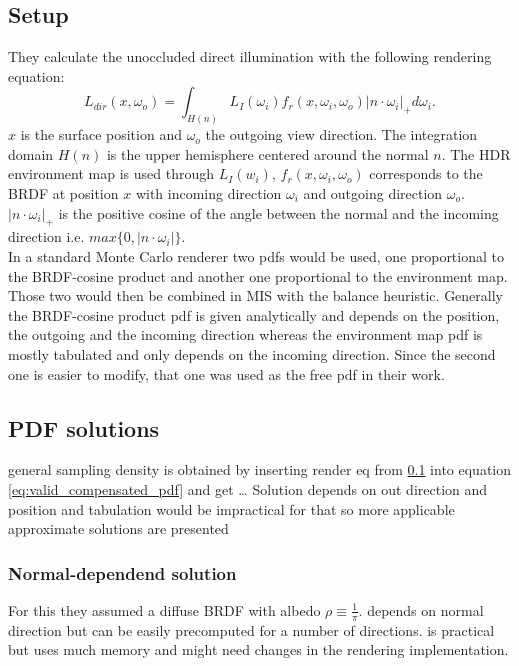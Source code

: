 \subsection{Setup}
\label{sec:ibl_setup}
They calculate the unoccluded direct illumination with the following rendering equation:
\begin{equation*}
    L_{dir}(x, \omega_o) = \int_{H(n)} L_I(\omega_i) f_r(x, \omega_i, \omega_o) |n \cdot \omega_i|_+ d\omega_i.
\end{equation*}
$ x $ is the surface position and $ \omega_o $ the outgoing view direction.
The integration domain $ H(n) $ is the upper hemisphere centered around the normal $ n $.
The HDR environment map is used through $ L_I(w_i) $,
$ f_r(x, \omega_i, \omega_o) $ corresponds to the BRDF at position $ x $
with incoming direction $ \omega_i $ and outgoing direction $ \omega_o $.
$ |n \cdot \omega_i|_+ $ is the positive cosine of the angle between the normal and the incoming direction i.e. $ max\{0, |n \cdot \omega_i|\} $.\\
In a standard Monte Carlo renderer two pdfs would be used,
one proportional to the BRDF-cosine product and another one proportional to the environment map.
Those two would then be combined in MIS with the balance heuristic.
Generally the BRDF-cosine product pdf is given analytically and depends on the position, the outgoing and the incoming direction
whereas the environment map pdf is mostly tabulated and only depends on the incoming direction.
Since the second one is easier to modify,
that one was used as the free pdf in their work.


\subsection{PDF solutions}
\label{sec:ibl_pdfs}
general sampling density is obtained by inserting render eq from \ref{sec:ibl_setup} into equation \ref{eq:valid_compensated_pdf} and get \dots
Solution depends on out direction and position and tabulation would be impractical for that so more applicable approximate solutions are presented


\subsubsection{Normal-dependend solution}
\label{sec:ibl_normal_dependent}
For this they assumed a diffuse BRDF with albedo $ \rho \equiv \frac{1}{\pi} $.
depends on normal direction but can be easily precomputed for a number of directions.
is practical but uses much memory and might need changes in the rendering implementation.


